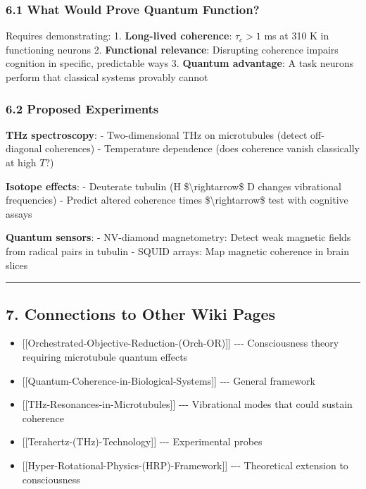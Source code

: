 \subsubsection{6.1 What Would Prove Quantum
Function?}\label{what-would-prove-quantum-function}

Requires demonstrating: 1. \textbf{Long-lived coherence}: \(\tau_c > 1\)
ms at 310 K in functioning neurons 2. \textbf{Functional relevance}:
Disrupting coherence impairs cognition in specific, predictable ways 3.
\textbf{Quantum advantage}: A task neurons perform that classical
systems provably cannot

\subsubsection{6.2 Proposed Experiments}\label{proposed-experiments}

\textbf{THz spectroscopy}: - Two-dimensional THz on microtubules (detect
off-diagonal coherences) - Temperature dependence (does coherence vanish
classically at high \(T\)?)

\textbf{Isotope effects}: - Deuterate tubulin (H
\$\textbackslash rightarrow\$ D changes vibrational frequencies) -
Predict altered coherence times \$\textbackslash rightarrow\$ test with
cognitive assays

\textbf{Quantum sensors}: - NV-diamond magnetometry: Detect weak
magnetic fields from radical pairs in tubulin - SQUID arrays: Map
magnetic coherence in brain slices

\begin{center}\rule{0.5\linewidth}{0.5pt}\end{center}

\subsection{7. Connections to Other Wiki
Pages}\label{connections-to-other-wiki-pages}

\begin{itemize}
\tightlist
\item
  {[}{[}Orchestrated-Objective-Reduction-(Orch-OR){]}{]} -\/-\/-
  Consciousness theory requiring microtubule quantum effects
\item
  {[}{[}Quantum-Coherence-in-Biological-Systems{]}{]} -\/-\/- General
  framework
\item
  {[}{[}THz-Resonances-in-Microtubules{]}{]} -\/-\/- Vibrational modes
  that could sustain coherence
\item
  {[}{[}Terahertz-(THz)-Technology{]}{]} -\/-\/- Experimental probes
\item
  {[}{[}Hyper-Rotational-Physics-(HRP)-Framework{]}{]} -\/-\/-
  Theoretical extension to consciousness
\end{itemize}

